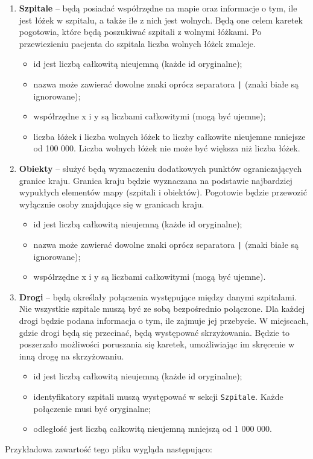 \documentclass[12pt,a4paper]{article}
\begin{document}
\begin{enumerate}
\item \textbf{Szpitale} – będą posiadać współrzędne na mapie oraz informacje o tym, ile jest łóżek w szpitalu, a także ile z nich jest wolnych. Będą one celem karetek pogotowia, które będą poszukiwać szpitali z wolnymi łóżkami. Po przewiezieniu pacjenta do szpitala liczba wolnych łóżek zmaleje. 

\begin{itemize}
\item id jest liczbą całkowitą nieujemną (każde id oryginalne);
\item nazwa może zawierać dowolne znaki oprócz separatora \texttt{|} (znaki białe są ignorowane);
\item współrzędne x i y są liczbami całkowitymi (mogą być ujemne);
\item liczba łóżek i liczba wolnych łóżek to liczby całkowite nieujemne mniejsze od 100 000. Liczba wolnych łóżek nie może być większa niż liczba łóżek.
\end{itemize}

\item \textbf{Obiekty} – służyć będą wyznaczeniu dodatkowych punktów ograniczających granice kraju. Granica kraju będzie wyznaczana na podstawie najbardziej wypukłych elementów mapy (szpitali i obiektów). Pogotowie będzie przewozić wyłącznie osoby znajdujące się w granicach kraju. 

\begin{itemize}
\item id jest liczbą całkowitą nieujemną (każde id oryginalne); 
\item nazwa może zawierać dowolne znaki oprócz separatora \texttt{|} (znaki białe są ignorowane);
\item współrzędne x i y są liczbami całkowitymi (mogą być ujemne).
\end{itemize}

\item \textbf{Drogi} – będą określały połączenia występujące między danymi szpitalami. Nie wszystkie szpitale muszą być ze sobą bezpośrednio połączone. Dla każdej drogi będzie podana informacja o tym, ile zajmuje jej przebycie. W miejscach, gdzie drogi będą się przecinać, będą występować skrzyżowania. Będzie to poszerzało możliwości poruszania się karetek, umożliwiając im skręcenie w inną drogę na skrzyżowaniu.

\begin{itemize}
\item id jest liczbą całkowitą nieujemną (każde id oryginalne); 
\item identyfikatory szpitali muszą występować w sekcji \texttt{Szpitale}. Każde połączenie musi być oryginalne;
\item odległość jest liczbą całkowitą nieujemną mniejszą od 1 000 000.
\end{itemize}

\end{enumerate}
Przykładowa zawartość tego pliku wygląda następująco:
\end{document}
